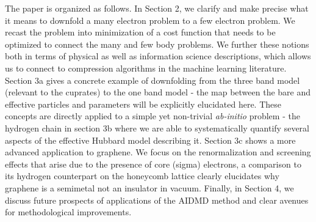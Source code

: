 \documentclass[prl,12pt,onecolumn,nofootinbib,notitlepage,english,superscriptaddress]{revtex4-1}
\begin{document}

The paper is organized as follows. In Section 2, we clarify and make precise what it means to downfold 
a many electron problem to a few electron problem. We recast the problem into minimization 
of a cost function that needs to be optimized to connect the many and few body problems. We further 
these notions both in terms of physical as well as information science descriptions, which allows us to connect to 
compression algorithms in the machine learning literature. Section 3a gives a concrete example of downfolding from 
the three band model (relevant to the cuprates) to the one band model - the map between the bare and 
effective particles and parameters will be explicitly elucidated here. These concepts are directly applied 
to a simple yet non-trivial \emph{ab-initio} problem - the hydrogen chain in section 3b where we are able to 
systematically quantify several aspects of the effective Hubbard model describing it. Section 3c 
shows a more advanced application to graphene. We focus on the renormalization and screening effects that arise 
due to the presence of core (sigma) electrons, a comparison to its hydrogen counterpart on the honeycomb lattice 
clearly elucidates why graphene is a semimetal not an insulator in vacuum. 
Finally, in Section 4, we discuss future prospects of applications of the AIDMD method and 
clear avenues for methodological improvements. 
\end{document}
